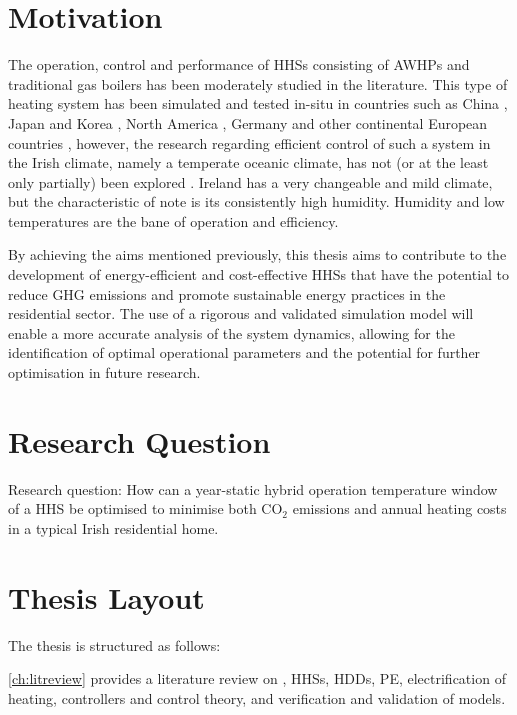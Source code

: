 \section{Motivation}
The operation, control and performance of \acp{HHS} consisting of \acp{AWHP} and traditional gas boilers has been moderately studied in the literature. This type of heating system has been simulated and tested in-situ in countries such as China \cite{li_parallel_2018}, Japan and Korea \cite{jang_continuous_2013, park_performance_2014}, North America \cite{rauschkolb_cost-optimal_2020, }, Germany \cite{klein_numerical_2014} and other continental European countries \cite{bagarella_annual_2016, roccatello_analysis_2022, amirkhizi_cost_2020, dongellini_influence_2021,di_perna_experimental_2015}, however, the research regarding efficient control of such a system in the Irish climate, namely a temperate oceanic climate, has not (or at the least only partially) been explored \cite{heinen_electricity_2016}. Ireland has a very changeable and mild climate, but the characteristic of note is its consistently high humidity. Humidity and low temperatures are the bane of \HP operation and efficiency.

By achieving the aims mentioned previously, this thesis aims to contribute to the development of energy-efficient and cost-effective \acp{HHS} that have the potential to reduce \ac{GHG} emissions and promote sustainable energy practices in the residential sector. The use of a rigorous and validated simulation model will enable a more accurate analysis of the system dynamics, allowing for the identification of optimal operational parameters and the potential for further optimisation in future research.

\section{Research Question} 
Research question: How can a year-static hybrid operation temperature window of a \ac{HHS} be optimised to minimise both $\text{CO}_2$ emissions and annual heating costs in a typical Irish residential home.

\section{Thesis Layout}
The thesis is structured as follows: 

\cref{ch:litreview} provides a literature review on \HPs,  \acp{HHS}, \acp{HDD}, \ac{PE}, electrification of heating, controllers and control theory, and verification and validation of models.

